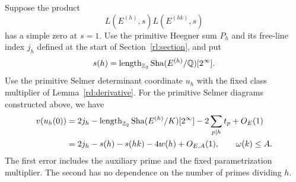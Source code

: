 \begin{proposition}
\label{rd:central-formula}
Suppose the product
\[
 L(E^{(h)},s)L(E^{(hk)},s)
\]
has a simple zero at \(s=1\).
Use the primitive Heegner sum \(P_h\) and its free-line index
\(j_h\) defined at the start of Section~\ref{rl:section}, and put
\[
 s(h)=\operatorname{length}_{\mathbb Z_2}
             \operatorname{Sha}(E^{(h)}/\mathbb Q)[2^\infty].
 \]
Use the primitive Selmer determinant coordinate \(u_h\)
with the fixed class multiplier of Lemma~\ref{rd:derivative}.
For the primitive Selmer diagrams constructed above, we have
\begin{equation}
 \begin{split}
 v(u_h(0))
  &=2j_h-
    \operatorname{length}_{\mathbb Z_2}
                  \operatorname{Sha}(E^{(h)}/K)[2^\infty]
    -2\sum_{p\mid h}t_p+O_E(1)\\
  &=2j_h-s(h)-s(hk)-4w(h)+O_{E,A}(1),
       \qquad \omega(k)\le A .
 \end{split}
 \label{rd:central-value}
\end{equation}
The first error includes the auxiliary prime and the fixed
parametrization multiplier.  The second has no dependence
on the number of primes dividing \(h\).
\end{proposition}

